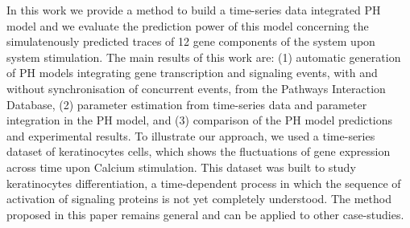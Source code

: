 In this work we provide a method to build a time-series data integrated PH model and we evaluate 
the prediction power of this model concerning the simulatenously predicted traces of 12 gene components of the system upon system stimulation.
The main  results of this work are: (1) automatic generation of PH models integrating gene transcription and signaling events, 
with and without synchronisation of concurrent events, from the Pathways Interaction Database, 
(2) parameter estimation from time-series data and parameter integration in the PH model, and
(3) comparison of the PH model predictions and experimental results.
To illustrate our approach, we used a time-series dataset of keratinocytes cells, which shows
 the fluctuations of gene expression across time upon Calcium stimulation.
This dataset was built to study keratinocytes differentiation, a time-dependent
 process in which the sequence of activation of signaling proteins is not yet completely understood.
The method proposed in this paper remains general and can be applied to other case-studies.



 
